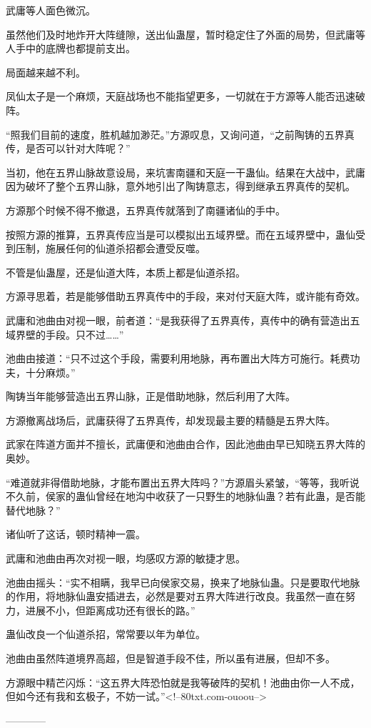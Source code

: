 \begin{this_body}
武庸等人面色微沉。

虽然他们及时地炸开大阵缝隙，送出仙蛊屋，暂时稳定住了外面的局势，但武庸等人手中的底牌也都提前支出。

局面越来越不利。

凤仙太子是一个麻烦，天庭战场也不能指望更多，一切就在于方源等人能否迅速破阵。

“照我们目前的速度，胜机越加渺茫。”方源叹息，又询问道，“之前陶铸的五界真传，是否可以针对大阵呢？”

当初，他在五界山脉故意设局，来坑害南疆和天庭一干蛊仙。结果在大战中，武庸因为破坏了整个五界山脉，意外地引出了陶铸意志，得到继承五界真传的契机。

方源那个时候不得不撤退，五界真传就落到了南疆诸仙的手中。

按照方源的推算，五界真传应当是可以模拟出五域界壁。而在五域界壁中，蛊仙受到压制，施展任何的仙道杀招都会遭受反噬。

不管是仙蛊屋，还是仙道大阵，本质上都是仙道杀招。

方源寻思着，若是能够借助五界真传中的手段，来对付天庭大阵，或许能有奇效。

武庸和池曲由对视一眼，前者道：“是我获得了五界真传，真传中的确有营造出五域界壁的手段。只不过……”

池曲由接道：“只不过这个手段，需要利用地脉，再布置出大阵方可施行。耗费功夫，十分麻烦。”

陶铸当年能够营造出五界山脉，正是借助地脉，然后利用了大阵。

方源撤离战场后，武庸获得了五界真传，却发现最主要的精髓是五界大阵。

武家在阵道方面并不擅长，武庸便和池曲由合作，因此池曲由早已知晓五界大阵的奥妙。

“难道就非得借助地脉，才能布置出五界大阵吗？”方源眉头紧皱，“等等，我听说不久前，侯家的蛊仙曾经在地沟中收获了一只野生的地脉仙蛊？若有此蛊，是否能替代地脉？”

诸仙听了这话，顿时精神一震。

武庸和池曲由再次对视一眼，均感叹方源的敏捷才思。

池曲由摇头：“实不相瞒，我早已向侯家交易，换来了地脉仙蛊。只是要取代地脉的作用，将地脉仙蛊安插进去，必然是要对五界大阵进行改良。我虽然一直在努力，进展不小，但距离成功还有很长的路。”

蛊仙改良一个仙道杀招，常常要以年为单位。

池曲由虽然阵道境界高超，但是智道手段不佳，所以虽有进展，但却不多。

方源眼中精芒闪烁：“这五界大阵恐怕就是我等破阵的契机！池曲由你一人不成，但如今还有我和玄极子，不妨一试。”<!--80txt.com-ouoou-->

------------

\end{this_body}

